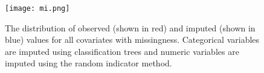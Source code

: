 \documentclass[11pt]{article}
\begin{document}
\begin{figure}[!htpb]
\centering
\texttt{[image: mi.png]}
\caption{The distribution of observed (shown in red) and imputed (shown in blue) values for all covariates with missingness. Categorical variables are imputed using classification trees and numeric variables are imputed using the random indicator method.}
\label{fig:mi}
\end{figure}

\clearpage



\end{document}
